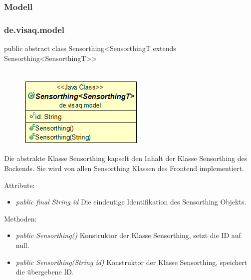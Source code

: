 \subsubsection{Modell}

\subsubsection{de.visaq.model}

public abstract class Sensorthing<SensorthingT extends Sensorthing<SensorthingT>>
\\\\
\begin{minipage}{0.3\textwidth}
	\begin{figure}[H]
		\includegraphics[scale = 0.5
		]{media/frontend/model/SensorthingClass.png}
	\end{figure}
\end{minipage} \hfill
\begin{minipage}{0.6\textwidth}
	Die abstrakte Klasse Sensorthing kapselt den Inhalt der Klasse Sensorthing des Backends. Sie wird von allen Sensorthing Klassen des Frontend implementiert.
\end{minipage}

Attribute:
\begin{itemize} 
	\item \emph{public final String id} Die eindeutige Identifikation des Sensorthing Objekts.
\end{itemize}
Methoden:
\begin{itemize} 
	\item \emph{public Sensorthing()} Konstruktor der Klasse Sensorthing, setzt die ID auf null.
	\item \emph{public Sensorthing(String id)} Konstruktor der Klasse Sensorthing, speichert die übergebene ID.
\end{itemize}

